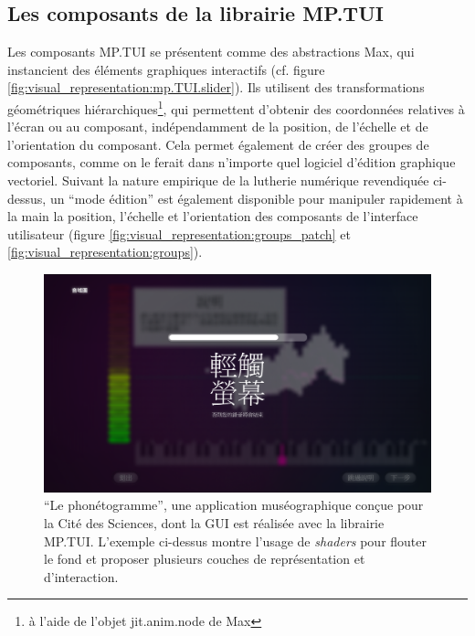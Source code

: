 \subsection{Les composants de la librairie MP.TUI}

\noindent Les composants MP.TUI se présentent comme des abstractions Max, qui instancient des éléments graphiques interactifs (cf. figure \ref{fig:visual_representation:mp.TUI.slider}). Ils utilisent des transformations géométriques hiérarchiques\footnote{à l'aide de l'objet jit.anim.node de Max}, qui permettent d'obtenir des coordonnées relatives à l'écran ou au composant, indépendamment de la position, de l'échelle et de l'orientation du composant. Cela permet également de créer des groupes de composants, comme on le ferait dans n'importe quel logiciel d'édition graphique vectoriel. Suivant la nature empirique de la lutherie numérique revendiquée ci-dessus, un ``mode édition'' est également disponible pour manipuler rapidement à la main la position, l'échelle et l'orientation des composants de l'interface utilisateur (figure \ref{fig:visual_representation:groups_patch} et \ref{fig:visual_representation:groups}).

\begin{figure}[!htbp]
	\captionsetup{format=plain}%
	\includegraphics[width=\textwidth]{gfx/06_visual_representation/Phonetogramme.png}
	\caption[\textit{Le phonétogramme}, application réalisée à l'aide de la librairie MP.TUI]{``Le phonétogramme'', une application muséographique conçue pour la Cité des Sciences, dont la GUI est réalisée avec la librairie MP.TUI. L'exemple ci-dessus montre l'usage de \textit{shaders} pour flouter le fond et proposer plusieurs couches de représentation et d'interaction.}
	\label{fig:visual_representation:phonetogramme}
\end{figure}


